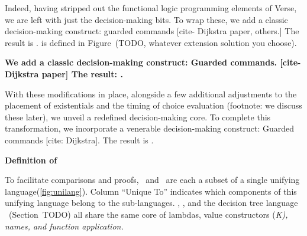 \documentclass[manuscript,screen,review, 12pt]{acmart}
\begin{document}
\begin{outline}[enumerate]
    

        Indeed, having stripped out the functional logic programming elements of
        Verse, we are left with just the decision-making bits. To wrap these, we
        add a classic decision-making construct: guarded commands [cite-
        Dijkstra paper, others.] The result is \VMinus. \VMinus is defined in 
        Figure~(TODO, whatever extension solution you choose). 

        
        \2 \bf{We add a classic decision-making construct: Guarded commands. } [cite- Dijkstra paper]
        \2 \bf{The result: \VMinus. }
        
        With these modifications in place, alongside a few additional
        adjustments to the placement of existentials and the timing of choice
        evaluation (footnote: we discuss these later), we unveil a redefined decision-making core. To complete this
        transformation, we incorporate a venerable decision-making construct:
        Guarded commands [cite: Dijkstra]. The result is \VMinus. 

    \1 \bf{Definition of \VMinus}

    To facilitate comparisons and proofs, \VMinus\ and \PPlus\ are each a subset
    of a single unifying language(\cref{fig:unilang}). Column “Unique To” indicates
    which components of this unifying language belong to the sub-languages. 
    \PPlus, \VMinus, and the decision tree language \D\ (Section~TODO) all share 
    the same core of lambdas, value constructors (\it{K}), names, and function 
    application. 



\end{outline}
\end{document}
